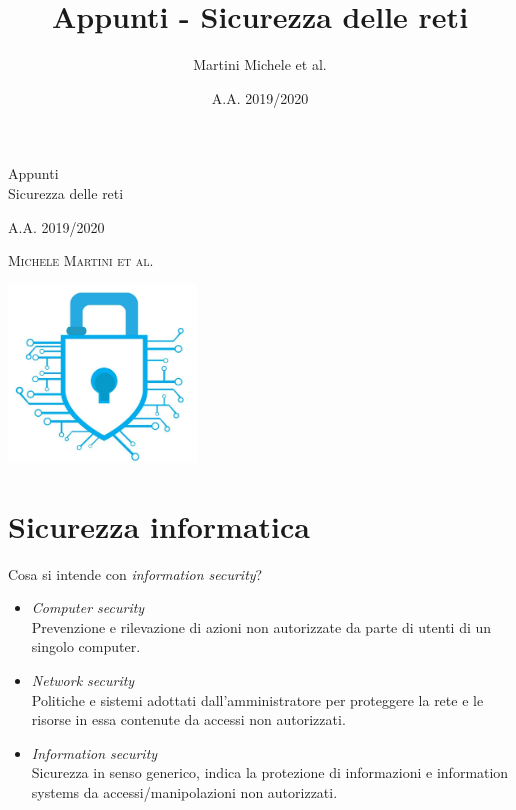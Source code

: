 \documentclass[a4paper, 11pt, twoside, openright, fleqn]{report}
\title{Appunti - Sicurezza delle reti}
\author{Martini Michele {\footnotesize et al.}}
\date{A.A. 2019/2020}
\begin{document}
\begin{titlepage}
	\begin{adjustwidth}{0cm}{-1.8cm}
	\thispagestyle{empty}
	\centering
	{\huge 
		Appunti\\{\Huge Sicurezza delle reti}\par}
	\vspace{4\baselineskip}
	A.A. 2019/2020\par
	{\textsc{\footnotesize {\normalsize Michele Martini} et al.}\par}
	\vfil
	\includegraphics[width=5cm]{images/logo}
		\end{adjustwidth}
\end{titlepage}

\setcounter{tocdepth}{1}
\tableofcontents

\chapter{Sicurezza informatica}
Cosa si intende con \emph{information security}?
\begin{itemize}
	\item \emph{Computer security}\\
	Prevenzione e rilevazione di azioni non autorizzate da parte di utenti di un singolo computer.
	\item \emph{Network security}\\
	Politiche e sistemi adottati dall'amministratore per proteggere la rete e le risorse in essa contenute da accessi non autorizzati.
	\item \emph{Information security}\\
	Sicurezza in senso generico, indica la protezione di informazioni e information systems da accessi/manipolazioni non autorizzati.
\end{itemize}
\end{document}
